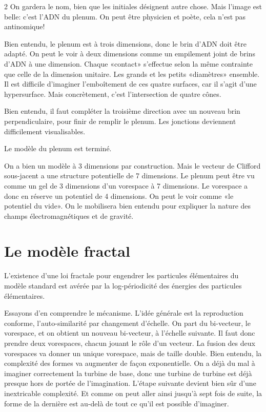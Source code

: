 \begin{multicols}{2}
On gardera le nom, bien que les initiales désignent autre chose. Mais
l'image est belle: c'est l'ADN du plenum. On peut être physicien et
poète, cela n'est pas antinomique!

Bien entendu, le plenum est à trois dimensions, donc le brin d'ADN
doit être adapté. On peut le voir à deux dimensions comme un
empilement joint de brins d'ADN à une dimension. Chaque «contact»
s'effectue selon la même contrainte que celle de la dimension
unitaire. Les grands et les petits «diamètres» ensemble. Il est
difficile d'imaginer l'emboîtement de ces quatre surfaces, car il
s'agit d'une hypersurface. Mais concrètement, c'est l'intersection de
quatre cônes.

Bien entendu, il faut compléter la troisième direction avec un nouveau
brin perpendiculaire, pour finir de remplir le plenum. Les jonctions
deviennent difficilement visualisables.

Le modèle du plenum est terminé.
\medskip

On a bien un modèle à 3 dimensions par construction. Mais le vecteur
de Clifford sous-jacent a une structure potentielle de 7 dimensions.
Le plenum peut être vu comme un gel de 3 dimensions d'un vorespace
à 7 dimensions. Le vorespace a donc en réserve un
potentiel de 4 dimensions. On peut le voir comme «le potentiel du
vide». On le mobilisera bien entendu pour expliquer la nature des
champs électromagnétiques et de gravité.

\section{Le modèle fractal}

L'existence d'une loi fractale pour engendrer les particules
élémentaires du modèle standard est avérée par la log-périodicité des
énergies des particules élémentaires.

Essayons d'en comprendre le mécanisme. L'idée générale est la
reproduction conforme, l'auto-similarité par changement d'échelle.
On part du bi-vecteur, le vorespace, et on obtient un nouveau
bi-vecteur, à l'échelle suivante. Il faut donc prendre deux
vorespaces, chacun jouant le rôle d'un vecteur. La fusion des deux
vorespaces va donner un unique vorespace, mais de taille double. Bien
entendu, la complexité des formes va augmenter de façon exponentielle.
On a déjà du mal à imaginer correctement la turbine de base, donc une
turbine de turbine est déjà presque hors de portée de l'imagination.
L'étape suivante devient bien sûr d'une inextricable complexité. Et
comme on peut aller ainsi jusqu'à sept fois de suite, la forme de la dernière
est au-delà de tout ce qu'il est possible d'imaginer.


\end{multicols}
